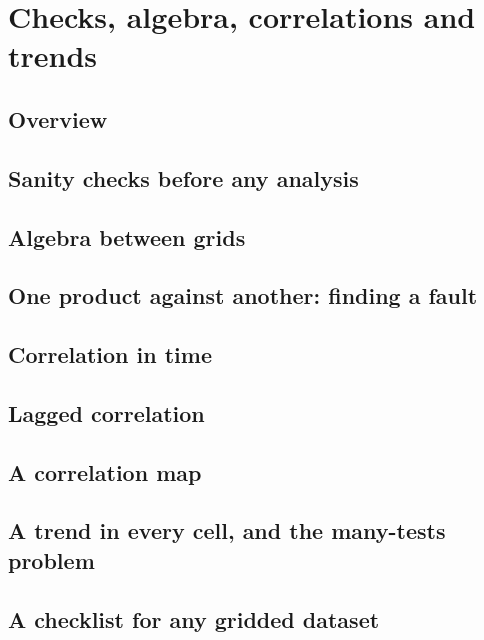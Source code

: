 \chapter{Checks, algebra, correlations and trends}\label{ch:checks}

\section{Overview}


\section{Sanity checks before any analysis}


\section{Algebra between grids}


\section{One product against another: finding a fault}


\section{Correlation in time}


\section{Lagged correlation}


\section{A correlation map}


\section{A trend in every cell, and the many-tests problem}


\section{A checklist for any gridded dataset}

